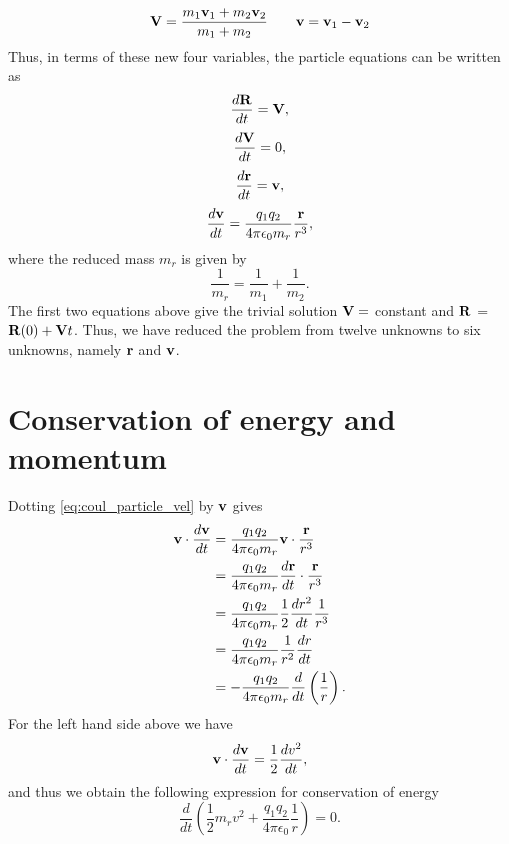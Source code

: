\documentclass[a4paper,11pt]{report}
\begin{document}
\begin{equation*}
    \mathbf{V} = \frac{m_1 \mathbf{v}_1 + m_2 \mathbf{v}_2}{m_1 + m_2} \qquad \mathbf{v} = \mathbf{v}_1 - \mathbf{v}_2
\end{equation*}
Thus, in terms of these new four variables, the particle equations can be written as
\begin{equation}
    \frac{d \mathbf{R}}{dt} = \mathbf{V},
\end{equation}
\begin{equation}
    \frac{d \mathbf{V}}{dt} = 0 ,
\end{equation}
\begin{equation}
    \label{eq:particle_pos}
    \frac{d \mathbf{r}}{dt} = \mathbf{v},
\end{equation}
\begin{equation}
    \label{eq:coul_particle_vel}
    \frac{d \mathbf{v}}{dt} = \frac{q_1 q_2}{4\pi \epsilon_0 m_r} \frac{\mathbf{r}}{r^3},
\end{equation}
where the reduced mass $m_r$ is given by
\begin{equation}
    \label{eq:coul_reduced_mass}
    \frac{1}{m_r} = \frac{1}{m_1} + \frac{1}{m_2}.
\end{equation}
The first two equations above give the trivial solution $\mathbf{V} = $ constant and $\mathbf{R}$ = $\mathbf{R}(0) + \mathbf{V} t$. Thus, we have reduced the problem from twelve unknowns to six unknowns, namely $\mathbf{r}$ and $\mathbf{v}$.

\section{Conservation of energy and momentum}
Dotting \cref{eq:coul_particle_vel} by $\mathbf{v}$ gives 
\begin{align*}
    \mathbf{v} \cdot \frac{d \mathbf{v}}{dt} &= \frac{q_1 q_2}{4 \pi \epsilon_0 m_r} \mathbf{v} \cdot \frac{\mathbf{r}}{r^3} \nonumber \\
    &= \frac{q_1 q_2}{4 \pi \epsilon_0 m_r} \frac{d\mathbf{r}}{dt} \cdot \frac{\mathbf{r}}{r^3} \nonumber \\
    &= \frac{q_1 q_2}{4 \pi \epsilon_0 m_r} \frac{1}{2} \frac{dr^2}{dt} \frac{1}{r^3} \nonumber \\
    &= \frac{q_1 q_2}{4 \pi \epsilon_0 m_r} \frac{1}{r^2} \frac{dr}{dt} \nonumber \\
    &= -\frac{q_1 q_2}{4 \pi \epsilon_0 m_r} \frac{d}{dt} \left ( \frac{1}{r} \right ).
\end{align*} 
For the left hand side above we have
\begin{equation*}
    \mathbf{v} \cdot \frac{d \mathbf{v}}{dt} = \frac{1}{2} \frac{d v^2}{dt},
\end{equation*}
and thus we obtain the following expression for conservation of energy
\begin{equation*}
    \frac{d}{dt} \left ( \frac{1}{2} m_r v^2 + \frac{q_1 q_2}{4 \pi \epsilon_0} \frac{1}{r} \right ) = 0.
\end{equation*}
\end{document}
